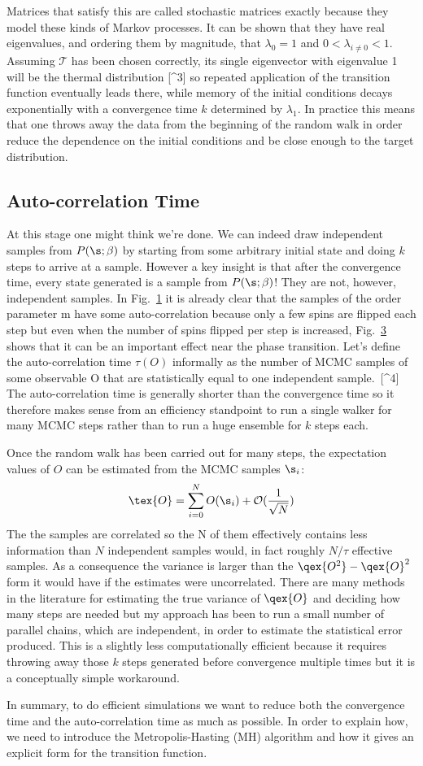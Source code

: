 Matrices that satisfy this are called stochastic matrices exactly because they model these kinds of Markov processes. It can be shown that they have real eigenvalues, and ordering them by magnitude, that \(\lambda_0 = 1\) and \(0 < \lambda_{i\neq0} < 1\). Assuming \(\mathcal{T}\) has been chosen correctly, its single eigenvector with eigenvalue 1 will be the thermal distribution {[}\^{}3{]} so repeated application of the transition function eventually leads there, while memory of the initial conditions decays exponentially with a convergence time \(k\) determined by \(\lambda_1\). In practice this means that one throws away the data from the beginning of the random walk in order reduce the dependence on the initial conditions and be close enough to the target distribution.

\hypertarget{auto-correlation-time}{%
\subsection{Auto-correlation Time}\label{auto-correlation-time}}

At this stage one might think we're done. We can indeed draw independent samples from \(P(\s; \beta)\) by starting from some arbitrary initial state and doing \(k\) steps to arrive at a sample. However a key insight is that after the convergence time, every state generated is a sample from \(P(\s; \beta)\)! They are not, however, independent samples. In Fig.~\protect\hyperlink{fig:raw}{1} it is already clear that the samples of the order parameter m have some auto-correlation because only a few spins are flipped each step but even when the number of spins flipped per step is increased, Fig.~\protect\hyperlink{fig:m_autocorr}{3} shows that it can be an important effect near the phase transition. Let's define the auto-correlation time \(\tau(O)\) informally as the number of MCMC samples of some observable O that are statistically equal to one independent sample.~{[}\^{}4{]} The auto-correlation time is generally shorter than the convergence time so it therefore makes sense from an efficiency standpoint to run a single walker for many MCMC steps rather than to run a huge ensemble for \(k\) steps each.

Once the random walk has been carried out for many steps, the expectation values of \(O\) can be estimated from the MCMC samples \(\s_i\): \[\tex{O} = \sum_{i = 0}^{N} O(\s_i) + \mathcal{O}(\frac{1}{\sqrt{N}})\] The the samples are correlated so the N of them effectively contains less information than \(N\) independent samples would, in fact roughly \(N/\tau\) effective samples. As a consequence the variance is larger than the \(\qex{O^2} - \qex{O}^2\) form it would have if the estimates were uncorrelated. There are many methods in the literature for estimating the true variance of \(\qex{O}\) and deciding how many steps are needed but my approach has been to run a small number of parallel chains, which are independent, in order to estimate the statistical error produced. This is a slightly less computationally efficient because it requires throwing away those \(k\) steps generated before convergence multiple times but it is a conceptually simple workaround.

In summary, to do efficient simulations we want to reduce both the convergence time and the auto-correlation time as much as possible. In order to explain how, we need to introduce the Metropolis-Hasting (MH) algorithm and how it gives an explicit form for the transition function.
